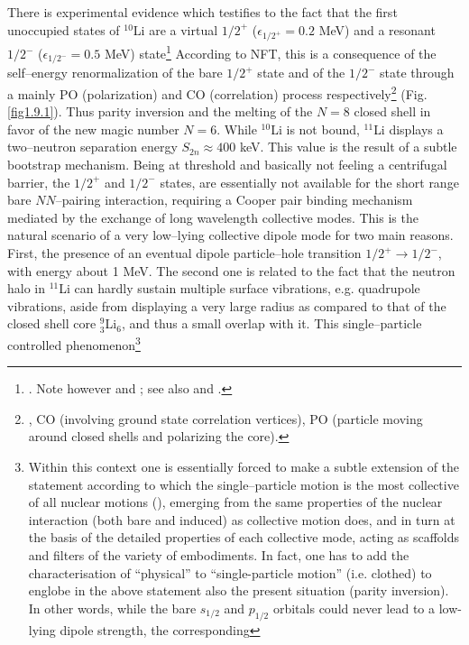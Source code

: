 There is  experimental evidence which testifies to the fact that the first unoccupied states of $^{10}$Li are a virtual $1/2^+$ ($\epsilon_{1/2^+}=0.2$ MeV) and a resonant $1/2^-$ ($\epsilon_{1/2^-}=0.5$ MeV) state\footnote{\cite{Zinser:95}. Note however \cite{Cavallaro:17} and \cite{Sanetullaev:16}; see also \cite{Barranco:18} and \cite{Moro:19}.}   According to NFT, this is a consequence of the self--energy renormalization of the bare $1/2^+$ state and of the $1/2^-$ state through a mainly PO (polarization) and CO (correlation) process respectively\footnote{\cite{Barranco:01}, CO (involving ground state correlation vertices), PO (particle moving around closed shells and polarizing the core).} (Fig. \ref{fig1.9.1}). Thus parity inversion and the melting of  the $N=8$ closed shell in favor of the new magic number $N=6$. While $^{10}$Li is not bound, $^{11}$Li displays a two--neutron separation energy $S_{2n}\approx400$ keV.  This value  is the result of a subtle bootstrap mechanism. Being at threshold and basically not feeling a centrifugal barrier, the $1/2^+$ and $1/2^-$ states, are essentially not available for the short range bare $NN$--pairing interaction, requiring a Cooper pair binding mechanism mediated by  the exchange of  long wavelength collective modes. This is the natural scenario of a very low--lying collective dipole mode for two main reasons. First, the presence of an eventual dipole particle--hole transition $1/2^+\rightarrow 1/2^-$, with energy about 1 MeV. The second one is related to  the fact that the neutron halo in $^{11}$Li can hardly sustain multiple surface vibrations, e.g. quadrupole vibrations, aside from displaying a very large radius as compared to that of the closed shell core $^9_3$Li$_6$, and thus a small overlap with it. This single--particle controlled phenomenon\footnote{Within this context one is essentially forced to make a subtle  extension of the statement according to which  the single--particle motion is the most collective  
of all nuclear motions (\cite{Mottelson:62}), emerging from  the same properties  of the nuclear interaction 
(both bare and induced) as collective motion does, 
and in turn at the basis of the detailed properties of each collective mode, acting as
 scaffolds and filters of the variety of embodiments. In fact, one 
has  to add the characterisation of ``physical'' to ``single-particle motion'' (i.e. clothed) to englobe in  the above statement 
also the present  situation (parity inversion). In other words, while the bare $s_{1/2}$ and $p_{1/2}$ orbitals could never lead to a low-lying dipole strength, the corresponding 
}
